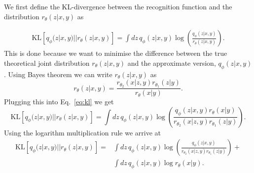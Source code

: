 %
%
We first define the \ac{KL}-divergence between the recognition 
function and the distribution $r_{\theta}(z|x,y)$ as

%
\begin{align}\label{eq:kl}
\text{KL}\left[q_{\phi}(z|x,y)||r_{\theta}(z|x,y)\right] =
\int dz\,q_{\phi}(z|x,y)
\log\left(\frac{q_{\phi}(z|x,y)}{r_{\theta}(z|x,y)}\right).%
\end{align}
%   
This is done because we want to minimise the difference between the 
true theoretical joint distribution $r_{\theta}(z|x,y)$ and 
the approximate version, $q_{\phi}(z|x,y)$.
Using Bayes theorem we can write $r_{\theta}(z|x,y)$ as 
%
\begin{equation}
    r_{\theta}(z|x,y) = \frac{r_{\theta_2}(x|z,y) r_{\theta_1}(z|y)}{r_{\theta}(x|y)}.\nonumber
\end{equation}
%
Plugging this into Eq.~\ref{eq:kl} we get
%
\begin{equation}
    \text{KL}\left[q_{\phi}(z|x,y)||r_{\theta}(z|x,y)\right] =
    \int dz\,q_{\phi}(z|x,y)
    \log\left(\frac{q_{\phi}(z|x,y) r_{\theta}(x|y)}{r_{\theta_2}(x|z,y) r_{\theta_1}(z|y)}\right).\nonumber
\end{equation}
%
Using the logarithm multiplication rule we arrive at
%
\begin{align}
    \text{KL}\left[q_{\phi}(z|x,y)||r_{\theta}(z|x,y)\right] =
    &\int dz\,q_{\phi}(z|x,y)
    \log\left(\frac{q_{\phi}(z|x,y)}{r_{\theta_2}(x|z,y) r_{\theta_1}(z|y)}\right) + \nonumber \\ 
    &\int dz\,q_{\phi}(z|x,y) \log r_{\theta}(x|y). \nonumber
\end{align}
